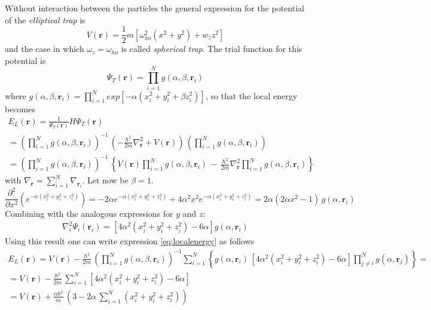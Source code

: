 \documentclass{article}
\newcommand{\bb}[1]{\mathbf{#1}}
\newcommand{\trialsemp}[2]{\prod_{i=1}^{N} exp\left[-{#1}\left(x_i^2 + y_i^2 + {#2} z_i^2\right)\right]}
\newcommand{\trialsempsing}[2]{e^{-{#1}\left(x_i^2 + y_i^2 + {#2} z_i^2\right)}}
\begin{document}
\raggedright 
Without interaction between the particles the general expression for the potential of the \emph{elliptical trap} is
$$ V(\bb{r}) = \frac{1}{2}m\left[\omega_{ho}^2(x^2+y^2) + w_zz^2\right] $$
and the case in which $\omega_z=\omega_{ho}$ is called \emph{spherical trap}.
The trial function for this potential is 
$$ \Psi_T(\bb{r}) = \prod_{i=1}^{N} g(\alpha, \beta, \bb{r}_i)$$
where $g(\alpha, \beta, \bb{r}_i) = \trialsemp{\alpha}{\beta}$, so that the local energy becomes 
\begin{equation}
    \begin{gathered}
    E_L(\bb{r}) = \frac{1}{\Psi_T(\bb{r})}H\Psi_T(\bb{r}) \\ 
    = \left(\prod_{i=1}^{N} g(\alpha, \beta, \bb{r}_i)\right)^{-1} \, 
    \left(-\frac{\hbar^2}{2m}\nabla_{\bb{r}}^2 + V(\bb{r})\right) \,
    \left(\prod_{i=1}^{N} g(\alpha, \beta, \bb{r}_i)\right)  \\
    = \left(\prod_{i=1}^{N} g(\alpha, \beta, \bb{r}_i)\right)^{-1} \,
    \left\{V(\bb{r})\prod_{i=1}^{N} g(\alpha, \beta, \bb{r}_i) \, - \, 
    \frac{\hbar^2}{2m}\nabla_{\bb{r}}^2 \prod_{i=1}^{N} g(\alpha, \beta, \bb{r}_i)\right\}
\end{gathered}
\label{eq:localenergy}
\end{equation}
with $\nabla_{\bb{r}} = \sum_{i=1}^N \nabla_{\bb{r}_i}$. Let now be $\beta=1$.
$$ \frac{\partial^2}{\partial x^2}\left(\trialsempsing{\alpha}{}\right) = 
-2\alpha \trialsempsing{\alpha}{} + 4 \alpha^2 x^2 \trialsempsing{\alpha}{} = 2\alpha\left(2\alpha x^2 - 1\right) \, g(\alpha, \bb{r}_i)$$
Combining with the analogous expressions for $y$ and $z$:
\begin{gather*} 
    \nabla_i^2 \Psi_i(\bb{r}_i) = \left[4\alpha^2(x_i^2 + y_i^2 + z_i^2) - 6\alpha\right] g(\alpha, \bb{r}_i)
\end{gather*}
Using this result one can write expression \ref{eq:localenergy} as follows
\begin{gather*}
    E_L({\bb{r}}) = V(\bb{r}) - \frac{\hbar^2}{2m} \, 
    \left(\prod_{i=1}^{N} g(\alpha, \beta, \bb{r}_i)\right)^{-1} \sum_{i=1}^N \left\{g(\alpha, \bb{r}_i) \, 
    \left[4\alpha^2(x_i^2 + y_i^2 + z_i^2) - 6\alpha\right] \prod_{j \neq i}^{N} g(\alpha, \bb{r}_j)\right\} = \\
    = V(\bb{r}) - \frac{\hbar^2}{2m} \, \sum_{i=1}^N \left[4\alpha^2(x_i^2 + y_i^2 + z_i^2) - 6\alpha\right] \\
    = V(\bb{r}) + \frac{\alpha\hbar^2}{m} \, \left(3 - 2\alpha \,\sum_{i=1}^N \left(x_i^2 + y_i^2 + z_i^2\right)\right)
\end{gather*}
\end{document}
